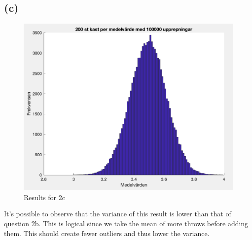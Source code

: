 \documentclass{article}
\begin{document}
\newpage
\subsection{(c)}
\begin{figure}[H]
    \centering
    \includegraphics[width=0.5\linewidth]{imgs/q2c_result.png}
    \caption{Results for 2c}
\end{figure}
It's possible to observe that the variance of this result is lower than that of question 2b. This is 
logical since we take the mean of more throws before adding them. This should create fewer outliers and thus lower the variance.
\end{document}
